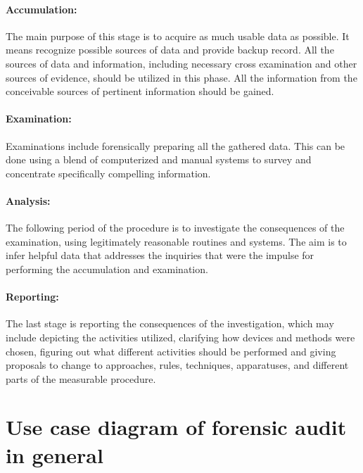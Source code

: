 \paragraph{Accumulation:} 
The main purpose of this stage is to acquire as much usable data as possible. It means recognize possible sources of data and provide backup record. All the sources of data and information, including necessary cross examination and other sources of evidence, should be utilized in this phase. All the information from the conceivable sources of pertinent information should be gained.

\paragraph{Examination:}
Examinations include forensically preparing all the gathered data. This can be done using a blend of computerized and manual systems to survey and concentrate specifically compelling information. 

\paragraph{Analysis:}
The following period of the procedure is to investigate the consequences of the examination, using legitimately reasonable routines and systems. The aim is to infer helpful data that addresses the inquiries that were the impulse for performing the accumulation and examination. %


\paragraph{Reporting:}
The last stage is reporting the consequences of the investigation, which may include depicting the activities utilized, clarifying how devices and methods were chosen, figuring out what different activities should be performed and giving proposals to change to approaches, rules, techniques, apparatuses, and different parts of the measurable procedure. 







\section{Use case diagram of forensic audit in general}

